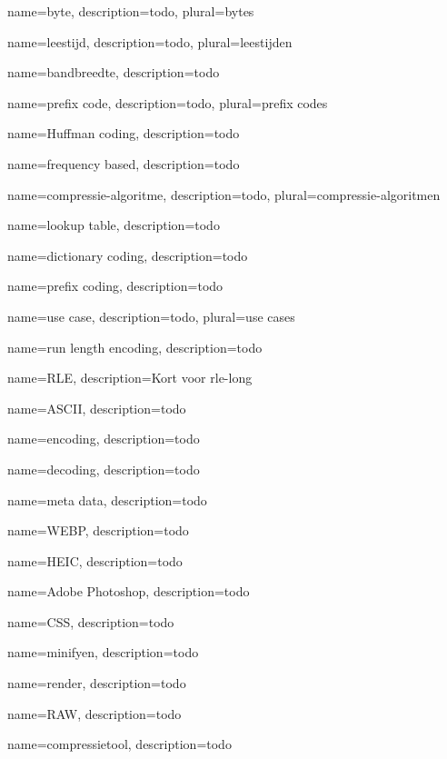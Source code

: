 {
	name={byte},
	description={todo},
	plural={bytes}
}

{
	name={leestijd},
	description={todo},
	plural={leestijden}
}

{
	name={bandbreedte},
	description={todo}
}

{
	name={prefix code},
	description={todo},
	plural={prefix codes}
}

{
	name={Huffman coding},
	description={todo}
}

{
	name={frequency based},
	description={todo}
}

{
	name={compressie-algoritme},
	description={todo},
	plural={compressie-algoritmen}
}

{
	name={lookup table},
	description={todo}
}

{
	name={dictionary coding},
	description={todo}
}

{
	name={prefix coding},
	description={todo}
}

{
	name={use case},
	description={todo},
	plural={use cases}
}

{
	name={run length encoding},
	description={todo}
}

{
	name={RLE},
	description={Kort voor \gls{rle-long}}
}

{
	name={ASCII},
	description={todo}
}

{
	name={encoding},
	description={todo}
}

{
	name={decoding},
	description={todo}
}

{
	name={meta data},
	description={todo}
}

{
	name={WEBP},
	description={todo}
}

{
	name={HEIC},
	description={todo}
}

{
	name={Adobe Photoshop},
	description={todo}
}

{
	name={CSS},
	description={todo}
}

{
	name={minifyen},
	description={todo}
}

{
	name={render},
	description={todo}
}

{
	name={RAW},
	description={todo}
}

{
	name={compressietool},
	description={todo}
}
